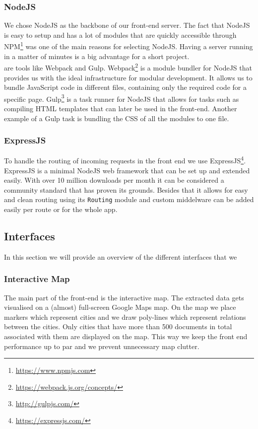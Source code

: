 \subsubsection{NodeJS}
We chose NodeJS as the backbone of our front-end server. The fact that NodeJS is easy to setup and has a lot of modules that are quickly accessible through NPM\footnote{\url{https://www.npmjs.com}} was one of the main reasons for selecting NodeJS. Having a server running in a matter of minutes is a big advantage for a short project.\\
 are tools like Webpack and Gulp. Webpack\footnote{\url{https://webpack.js.org/concepts/}} is a module bundler for NodeJS that provides us with the ideal infrastructure for modular development. It allows us to bundle JavaScript code in different files, containing only the required code for a specific page. Gulp\footnote{\url{http://gulpjs.com/}} is a task runner for NodeJS that allows for tasks such as compiling HTML templates that can later be used in the front-end. Another example of a Gulp task is bundling the CSS of all the modules to one file.
\subsubsection{ExpressJS}

To handle the routing of incoming requests in the front end we use ExpressJS\footnote{\url{https://expressjs.com/}}. ExpressJS is a minimal NodeJS web framework that can be set up and extended easily. With over 10 million downloads per month it can be considered a community standard that has proven its grounds. Besides that it allows for easy and clean routing using its \texttt{Routing} module and custom middelware can be added easily per route or for the whole app.

\subsection{Interfaces}
In this section we will provide an overview of the different interfaces that we 

\subsubsection{Interactive Map}
The main part of the front-end is the interactive map. The extracted data gets visualised on a (almost) full-screen Google Maps map. On the map we place markers which represent cities and we draw poly-lines which represent relations between the cities. Only cities that have more than 500 documents in total associated with them are displayed on the map. This way we keep the front end performance up to par and we prevent unnecessary map clutter.

